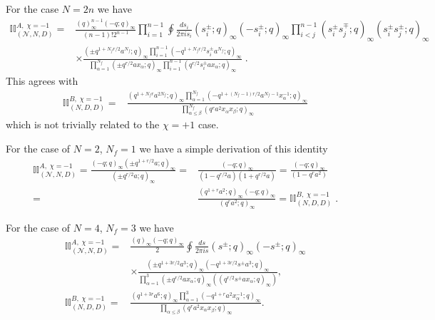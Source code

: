 \documentclass[12pt]{article}
\numberwithin{equation}{section}
\begin{document}
For the case $N = 2n$ we have
\begin{align}
\mathbb{II}_{(\mathcal{N},N,D)}^{A, \; \chi = -1}
 = &
\frac{(q)_{\infty}^{n-1} (-q; q)_{\infty}}{(n-1)! 2^{n-1}} \prod_{i=1}^{n-1} \oint \frac{ds_i}{2\pi i s_i}
(s_i^{\pm}; q)_{\infty} (-s_i^{\pm}; q)_{\infty}
\prod_{i < j}^{n-1} (s_i^{\pm} s_j^{\mp}; q)_{\infty} (s_i^{\pm} s_j^{\pm}; q)_{\infty}
 \nonumber \\
 &\times
\frac{(\pm q^{1+N_fr/2} a^{N_f}; q)_{\infty} \prod_{i = 1}^{n-1} (-q^{1+N_fr/2} s_i^{\pm} a^{N_f}; q)_{\infty}}{\prod_{\alpha = 1}^{N_f} (\pm q^{r/2} a x_{\alpha}; q)_{\infty} \prod_{i = 1}^{n-1} (q^{r/2} s_i^{\pm} a x_{\alpha}; q)_{\infty} } \; . 
\end{align}
This agrees with 
\begin{align}
\mathbb{II}_{(N,D,D)}^{B, \; \chi = -1} = &
 \frac{(q^{1+N_f r} a^{2N_f}; q)_{\infty} \prod_{\alpha=1}^{N_f} (-q^{1+(N_f - 1)r/2} a^{N_f - 1} x_{\alpha}^{-1}; q)_{\infty}}{\prod_{\alpha \le \beta}^{N_f} (q^r a^2 x_{\alpha} x_{\beta}; q)_{\infty}}
\end{align}
which is not trivially related to the $\chi = +1$ case.

For the case of $N=2$, $N_f = 1$ we have a simple derivation of this identity
\begin{align}
    \mathbb{II}_{(\mathcal{N},N,D)}^{A, \; \chi = -1} =
    \frac{(-q;q)_{\infty} (\pm q^{1+r/2} a; q)_{\infty}}{(\pm q^{r/2} a; q)_{\infty}}
    = & \frac{(-q;q)_{\infty}}{(1 - q^{r/2} a) (1 + q^{r/2} a)}
     = \frac{(-q;q)_{\infty}}{(1 - q^r a^2)}
    \nonumber \\
    = & \frac{(q^{1 + r} a^2; q)_{\infty} (-q; q)_{\infty}}{(q^r a^2; q)_{\infty}}
     = \mathbb{II}_{(N,D,D)}^{B, \; \chi = -1} \; .
\end{align}

For the case of $N=4$, $N_f = 3$ we have
\begin{align}
\label{so4nf3chi_M1_halfA}
\mathbb{II}_{(\mathcal{N},N,D)}^{A, \; \chi = -1}
 = &
\frac{(q)_{\infty} (-q; q)_{\infty}}{2} \oint \frac{ds}{2\pi i s}
(s^{\pm}; q)_{\infty} (-s^{\pm}; q)_{\infty}
 \nonumber \\
 &\times
\frac{(\pm q^{1+3r/2} a^3; q)_{\infty} (-q^{1+3r/2} s^{\pm} a^3; q)_{\infty}}{\prod_{\alpha = 1}^3 (\pm q^{r/2} a x_{\alpha}; q)_{\infty} \left( (q^{r/2} s^{\pm} a x_{\alpha}; q)_{\infty} \right)},
 \\
\label{so4nf3chi_M1_halfB}
\mathbb{II}_{(N,D,D)}^{B, \; \chi = -1} = &
 \frac{(q^{1+3r} a^6; q)_{\infty} \prod_{\alpha=1}^3 (-q^{1+r} a^2 x_{\alpha}^{-1}; q)_{\infty}}{\prod_{\alpha \le \beta} (q^r a^2 x_{\alpha} x_{\beta}; q)_{\infty}}. 
\end{align}
\end{document}
